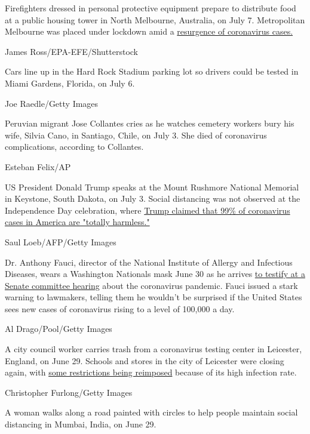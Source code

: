 Firefighters dressed in personal protective equipment prepare to
distribute food at a public housing tower in North Melbourne, Australia,
on July 7. Metropolitan Melbourne was placed under lockdown amid a
\href{https://www.cnn.com/2020/07/07/asia/melbourne-coronavirus-lockdown-intl-hnk/index.html}{resurgence
of coronavirus cases.}

James Ross/EPA-EFE/Shutterstock

Cars line up in the Hard Rock Stadium parking lot so drivers could be
tested in Miami Gardens, Florida, on July 6.

Joe Raedle/Getty Images

Peruvian migrant Jose Collantes cries as he watches cemetery workers
bury his wife, Silvia Cano, in Santiago, Chile, on July 3. She died of
coronavirus complications, according to Collantes.

Esteban Felix/AP

US President Donald Trump speaks at the Mount Rushmore National Memorial
in Keystone, South Dakota, on July 3. Social distancing was not observed
at the Independence Day celebration, where
\href{https://www.cnn.com/2020/07/05/politics/donald-trump-july-4-coronavirus/index.html}{Trump
claimed that 99\% of coronavirus cases in America are "totally
harmless."}

Saul Loeb/AFP/Getty Images

Dr. Anthony Fauci, director of the National Institute of Allergy and
Infectious Diseases, wears a Washington Nationals mask June 30 as he
arrives
\href{https://www.cnn.com/2020/06/30/politics/fauci-redford-testimony-senate-coronavirus/index.html}{to
testify at a Senate committee hearing} about the coronavirus pandemic.
Fauci issued a stark warning to lawmakers, telling them he wouldn't be
surprised if the United States sees new cases of coronavirus rising to a
level of 100,000 a day.

Al Drago/Pool/Getty Images

A city council worker carries trash from a coronavirus testing center in
Leicester, England, on June 29. Schools and stores in the city of
Leicester were closing again, with
\href{https://www.cnn.com/world/live-news/coronavirus-pandemic-06-30-20-intl/h_64a41a8d1320704c23448d991d0492d2}{some
restrictions being reimposed} because of its high infection rate.

Christopher Furlong/Getty Images

A woman walks along a road painted with circles to help people maintain
social distancing in Mumbai, India, on June 29.

